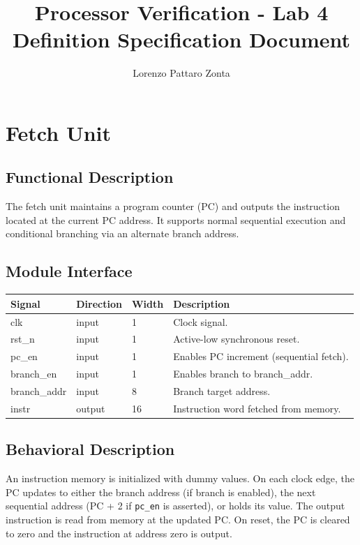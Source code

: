 \documentclass{article}
\title{Processor Verification - Lab 4 \\ Definition Specification Document}
\author{Lorenzo Pattaro Zonta}
\begin{document}
\maketitle

\section{Fetch Unit}

\subsection{Functional Description}
The fetch unit maintains a program counter (PC) and outputs the instruction located at the current PC address. It supports normal sequential execution and conditional branching via an alternate branch address.

\subsection{Module Interface}

\begin{table}[H]
\centering
    \begin{tabular}{|l|l|l|p{8cm}|}
    \hline
    \textbf{Signal} & \textbf{Direction} & \textbf{Width} & \textbf{Description} \\
    \hline
    clk         & input  & 1   & Clock signal. \\
    rst\_n      & input  & 1   & Active-low synchronous reset. \\
    pc\_en      & input  & 1   & Enables PC increment (sequential fetch). \\
    branch\_en  & input  & 1   & Enables branch to branch\_addr. \\
    branch\_addr& input  & 8   & Branch target address. \\
    instr       & output & 16  & Instruction word fetched from memory. \\
    \hline
    \end{tabular}
\end{table}

\subsection{Behavioral Description}
An instruction memory is initialized with dummy values. On each clock edge, the PC updates to either the branch address (if branch is enabled), the next sequential address (PC + 2 if \texttt{pc\_en} is asserted), or holds its value. The output instruction is read from memory at the updated PC. On reset, the PC is cleared to zero and the instruction at address zero is output.
\end{document}
